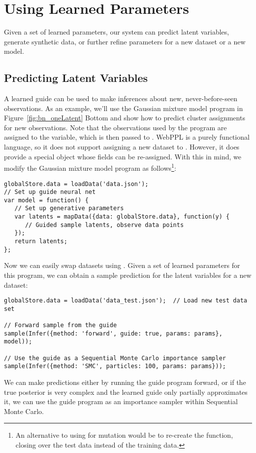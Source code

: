 \section{Using Learned Parameters}
\label{sec:usingLearnedGuides}

Given a set of learned parameters, our system can predict latent variables, generate synthetic data, or further refine parameters for a new dataset or a new model.

\subsection{Predicting Latent Variables}

A learned guide can be used to make inferences about new, never-before-seen observations. As an example, we'll use the Gaussian mixture model program in Figure~\ref{fig:bn_oneLatent} Bottom and show how to predict cluster assignments for new observations. Note that the observations used by the program are assigned to the  variable, which is then passed to . WebPPL is a purely functional language, so it does not support assigning a new dataset to . However, it does provide a special  object whose fields can be re-assigned. With this in mind, we modify the Gaussian mixture model program as follows\footnote{An alternative to using  for mutation would be to re-create the  function, closing over the test data instead of the training data.}:
\begin{lstlisting}
globalStore.data = loadData('data.json');
// Set up guide neural net
var model = function() {
   // Set up generative parameters
   var latents = mapData({data: globalStore.data}, function(y) {
      // Guided sample latents, observe data points
   });
   return latents;
};
\end{lstlisting}
Now we can easily swap datasets using . Given a set of learned parameters  for this program, we can obtain a sample prediction for the latent variables for a new dataset:
\begin{lstlisting}
globalStore.data = loadData('data_test.json');	// Load new test data set

// Forward sample from the guide
sample(Infer({method: 'forward', guide: true, params: params}, model));

// Use the guide as a Sequential Monte Carlo importance sampler
sample(Infer({method: 'SMC', particles: 100, params: params}));
\end{lstlisting}
We can make predictions either by running the guide program forward, or if the true posterior is very complex and the learned guide only partially approximates it, we can use the guide program as an importance sampler within Sequential Monte Carlo.

